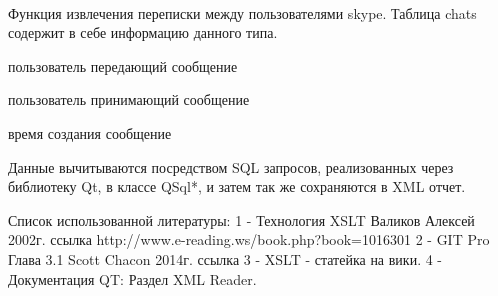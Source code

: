 \\Функция извлечения переписки между пользователями skype. Таблица chats содержит в себе информацию данного типа.
\item пользователь передающий сообщение 
\item пользователь принимающий сообщение 
\item время создания сообщение 

Данные вычитываются посредством SQL запросов, реализованных через библиотеку Qt, в классе QSql*, и затем так же сохраняются в XML отчет.

Список использованной литературы:
1 -  Технология XSLT Валиков Алексей 2002г. ссылка http://www.e-reading.ws/book.php?book=1016301
2 -  GIT Pro Глава 3.1 Scott Chacon 2014г. ссылка 
3 -  XSLT - статейка на вики.
4 -  Документация QT: Раздел XML Reader.